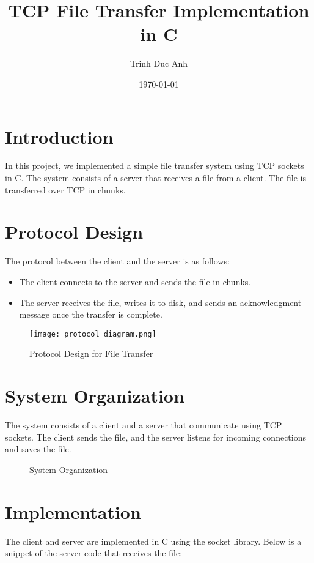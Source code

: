 \documentclass{article}
\title{TCP File Transfer Implementation in C}
\author{Trinh Duc Anh}
\date{\today}
\begin{document}
\maketitle

\section{Introduction}
In this project, we implemented a simple file transfer system using TCP sockets in C. The system consists of a server that receives a file from a client. The file is transferred over TCP in chunks.

\section{Protocol Design}
The protocol between the client and the server is as follows:
\begin{itemize}
    \item The client connects to the server and sends the file in chunks.
    \item The server receives the file, writes it to disk, and sends an acknowledgment message once the transfer is complete.
\end{itemize}

\begin{figure}[h!]
\centering
\texttt{[image: protocol\_diagram.png]}
\caption{Protocol Design for File Transfer}
\end{figure}

\section{System Organization}
The system consists of a client and a server that communicate using TCP sockets. The client sends the file, and the server listens for incoming connections and saves the file. 

\begin{figure}[h!]
\centering
{}
\caption{System Organization}
\end{figure}

\section{Implementation}
The client and server are implemented in C using the socket library. Below is a snippet of the server code that receives the file:
\end{document}
